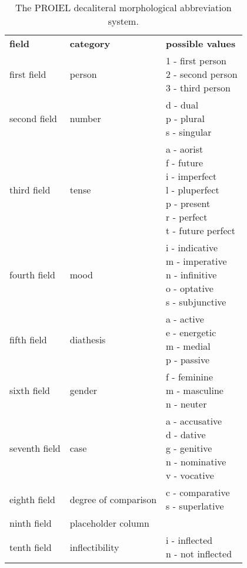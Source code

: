 \begin{table}
  \begin{tabular}{|l|l|l|}
    \hline
    \textbf{field}            & \textbf{category} & \textbf{possible values} \\ \thickhline
    first field & person & \specialcell{1 - first person\\2 - second person\\3 - third person} \\ \hline
    second field  & number & \specialcell{d - dual\\p - plural\\s - singular} \\ \hline
    third field & tense & \specialcell{a - aorist\\f - future\\i - imperfect\\l - pluperfect\\p - present\\r - perfect\\t - future perfect} \\ \hline
    fourth field & mood & \specialcell{i - indicative\\m - imperative\\n - infinitive\\o - optative\\s - subjunctive} \\ \hline
    fifth field & diathesis & \specialcell{a - active\\e - energetic\\m - medial\\p - passive} \\ \hline
    sixth field & gender & \specialcell{f - feminine\\m - masculine\\n - neuter} \\ \hline
    seventh field & case & \specialcell{a - accusative\\d - dative\\g - genitive\\n - nominative\\v - vocative} \\ \hline
    eighth field & degree of comparison & \specialcell{c - comparative\\s - superlative} \\ \hline
    ninth field & placeholder column & \specialcell{-} \\ \hline
    tenth field & inflectibility & \specialcell{i - inflected\\n - not inflected} \\ \hline
    \hline
  \end{tabular}
  \caption{The PROIEL decaliteral morphological abbreviation system.} \label{table:proielmorph}
\end{table}

